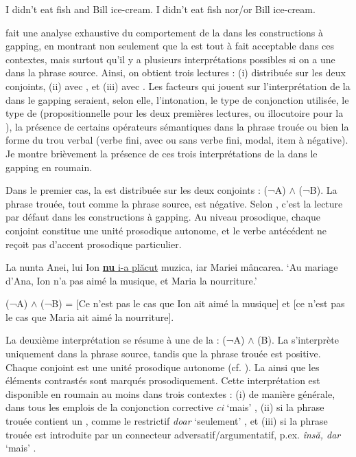 \ea \label{ch2:ex87}
\ea *I didn’t eat fish and Bill ice-cream. \citep{Sag1976}          
\ex I didn’t eat fish nor/or Bill ice-cream.           
\z
\z

\citet{Repp2009} fait une analyse exhaustive du comportement de la  dans les constructions à gapping, en montrant non seulement que la  est tout à fait acceptable dans ces contextes, mais surtout qu’il y a plusieurs interprétations possibles si on a une  dans la phrase source. Ainsi, on obtient trois lectures : (i)  distribuée sur les deux conjoints, (ii)  avec , et (iii)  avec . Les facteurs qui jouent sur l’interprétation de la  dans le gapping seraient, selon elle, l’intonation, le type de conjonction utilisée, le type de  (propositionnelle pour les deux premières lectures, ou illocutoire pour la ), la présence de certains opérateurs sémantiques dans la phrase trouée ou bien la forme du trou verbal (verbe fini,  avec ou sans verbe fini, modal, item à  négative). Je montre brièvement la présence de ces trois interprétations de la  dans le gapping en roumain.

Dans le premier cas, la  est distribuée sur les deux conjoints : (¬A) $\land$ (¬B). La phrase trouée, tout comme la phrase source, est négative. Selon \citet{Repp2009}, c’est la lecture par défaut dans les constructions à gapping. Au niveau prosodique, chaque conjoint constitue une unité prosodique autonome, et le verbe antécédent ne reçoit pas d’accent prosodique particulier. 

\ea
\ea La nunta Anei, lui Ion \uline{\textbf{nu} i-a plăcut} muzica, iar Mariei mâncarea.
\glt ‘Au mariage d’Ana, Ion n’a pas aimé la musique, et Maria la nourriture.’

\ex (¬A) $\land$ (¬B) = [Ce n’est pas le cas que Ion ait aimé la musique] et [ce n’est pas le cas que Maria ait aimé la nourriture].
\z
\z

La deuxième interprétation se résume à une  de la  : (¬A) $\land$ (B). La  s’interprète uniquement dans la phrase source, tandis que la phrase trouée est positive. Chaque conjoint est une unité prosodique autonome (cf. \citealt{Oehrle1987}). La  ainsi que les éléments contrastés sont marqués prosodiquement. Cette interprétation est disponible en roumain au moins dans trois contextes : (i) de manière générale, dans tous les emplois de la conjonction corrective \textit{ci} ‘mais’ , (ii) si la phrase trouée contient un , comme le restrictif \textit{doar} ‘seulement’ , et (iii) si la phrase trouée est introduite par un connecteur adversatif/argumentatif, p.ex. \textit{însă, dar} ‘mais’ .

